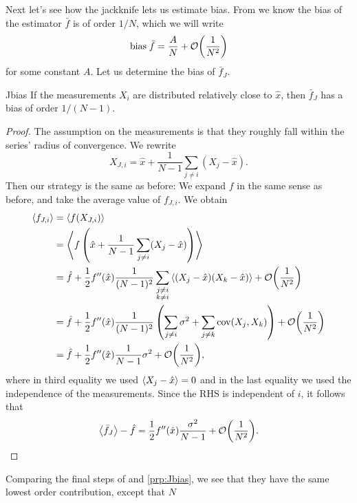 Next let's see how the jackknife lets us estimate bias.
From  we know the bias of the estimator $\bar{f}$ 
is of order $1/N$, which we will write
\begin{equation}\label{eq:bias}
  \text{bias}\;\bar{f}=\frac{A}{N}+\order{\frac{1}{N^2}}
\end{equation}
for some constant $A$. Let us determine the bias of $\bar{f}_J$.
\begin{proposition}{}{Jbias}
  If the measurements $X_i$ are distributed relatively close to $\hat{x}$, 
  then $\bar{f}_J$ has a bias of order $1/(N-1)$.
  \begin{proof}
    The assumption on the measurements is that they roughly fall within
    the series' radius of convergence. We rewrite
    $$
      X_{J,i}=\hat{x}+\frac{1}{N-1}\sum_{j\neq i}(X_j-\hat{x}).
    $$
    Then our strategy is the same as before: We expand $f$ in the same
    sense as before, and take the average value of $f_{J,i}$.
    We obtain
    \begin{equation*}
      \begin{aligned}
        \ev{f_{J,i}}&=\ev{f(X_{J,i})}\\
          &=\ev{f\left(\hat{x}
            +\frac{1}{N-1}\sum_{j\neq i}(X_j-\hat{x})\right)}\\
          &=\hat{f}+\frac{1}{2}f''(\hat{x})\frac{1}{(N-1)^2}
             \sum_{\substack{j\neq i\\k\neq i}}
              \ev{(X_j-\hat{x})(X_k-\hat{x})}
             +\order{\frac{1}{N^2}}\\
          &=\hat{f}+\frac{1}{2}f''(\hat{x})\frac{1}{(N-1)^2}\left(
             \sum_{j\neq i}\sigma^2+\sum_{j\neq k}\Cov(X_j,X_k)\right)
             +\order{\frac{1}{N^2}}\\
          &=\hat{f}+\frac{1}{2}f''(\hat{x})\frac{1}{N-1}\sigma^2
             +\order{\frac{1}{N^2}},
      \end{aligned}
    \end{equation*}
    where in third equality we used $\ev{X_j-\hat{x}}=0$ and in the
    last equality we used the independence of the measurements. Since
    the RHS is independent of $i$, it follows that
    $$
      \ev{\bar{f}_J}-\hat{f}=\frac{1}{2}f''(\hat{x})\frac{\sigma^2}{N-1}
       +\order{\frac{1}{N^2}}.
    $$
  \end{proof}
\end{proposition}
Comparing the final steps of  and \ref{prp:Jbias},
we see that they have the same lowest order contribution, except that $N$
